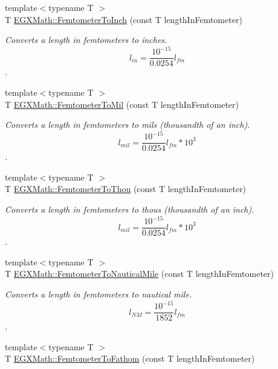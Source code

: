 \begin{DoxyCompactItemize}
{\footnotesize template$<$typename T $>$ }\\T \mbox{\hyperlink{group___e_g_x_math-_conversions-_length_conversions-_s_i-_femtometer-_imperial_ga51c3107a7cfac96232eb0b040c3192a1}{E\+G\+X\+Math\+::\+Femtometer\+To\+Inch}} (const T length\+In\+Femtometer)
\begin{DoxyCompactList}\small\item\em Converts a length in femtometers to inches. \[ l_{in}= \frac{10^{-15}}{0.0254} l_{fm} \]. \end{DoxyCompactList}\item 
{\footnotesize template$<$typename T $>$ }\\T \mbox{\hyperlink{group___e_g_x_math-_conversions-_length_conversions-_s_i-_femtometer-_imperial_gacfcd599a1c2c834f3bbb5f3f991d55df}{E\+G\+X\+Math\+::\+Femtometer\+To\+Mil}} (const T length\+In\+Femtometer)
\begin{DoxyCompactList}\small\item\em Converts a length in femtometers to mils (thousandth of an inch). \[ l_{mil}= \frac{10^{-15}}{0.0254} l_{fm} * 10^{3} \]. \end{DoxyCompactList}\item 
{\footnotesize template$<$typename T $>$ }\\T \mbox{\hyperlink{group___e_g_x_math-_conversions-_length_conversions-_s_i-_femtometer-_imperial_ga5c277d07215ad164ba2ad94e25b02ff1}{E\+G\+X\+Math\+::\+Femtometer\+To\+Thou}} (const T length\+In\+Femtometer)
\begin{DoxyCompactList}\small\item\em Converts a length in femtometers to thous (thousandth of an inch). \[ l_{mil}= \frac{10^{-15}}{0.0254} l_{fm} * 10^{3} \]. \end{DoxyCompactList}\item 
{\footnotesize template$<$typename T $>$ }\\T \mbox{\hyperlink{group___e_g_x_math-_conversions-_length_conversions-_s_i-_femtometer-_nautical_gae44357e3e44868120d603cff76cefd77}{E\+G\+X\+Math\+::\+Femtometer\+To\+Nautical\+Mile}} (const T length\+In\+Femtometer)
\begin{DoxyCompactList}\small\item\em Converts a length in femtometers to nautical mile. \[ l_{NM}= \frac{10^{-15}}{1852} l_{fm} \]. \end{DoxyCompactList}\item 
{\footnotesize template$<$typename T $>$ }\\T \mbox{\hyperlink{group___e_g_x_math-_conversions-_length_conversions-_s_i-_femtometer-_nautical_ga2a7aadfe2325db467434f8bc9b2d9ed9}{E\+G\+X\+Math\+::\+Femtometer\+To\+Fathom}} (const T length\+In\+Femtometer)

\end{DoxyCompactItemize}
